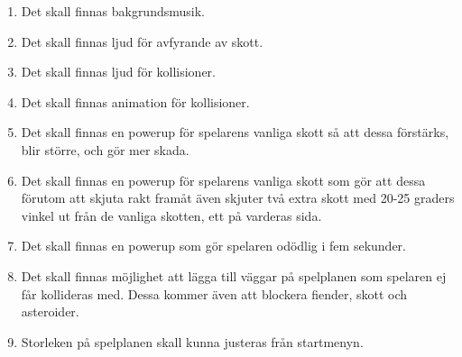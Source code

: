 \documentclass{TDP003mall}
\begin{document}
\begin{enumerate}
\item{Det skall finnas bakgrundsmusik.}
\item{Det skall finnas ljud för avfyrande av skott.}
\item{Det skall finnas ljud för kollisioner.}
\item{Det skall finnas animation för kollisioner.}
\item{Det skall finnas en powerup för spelarens vanliga skott så att dessa förstärks, blir större, 
och gör mer skada.}
\item{Det skall finnas en powerup för spelarens vanliga skott som gör att dessa förutom att skjuta rakt framåt
även skjuter två extra skott med 20-25 graders vinkel ut från de vanliga skotten, ett på varderas sida.}
\item{Det skall finnas en powerup som gör spelaren odödlig i fem sekunder.}
\item{Det skall finnas möjlighet att lägga till väggar på spelplanen som spelaren ej får kollideras med.
Dessa kommer även att blockera fiender, skott och asteroider.}
\item{Storleken på spelplanen skall kunna justeras från startmenyn.}

\end{enumerate}
\end{document}
